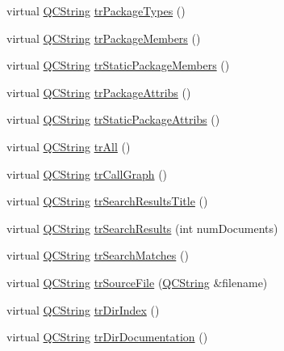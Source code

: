 \begin{DoxyCompactItemize}
\item 
virtual \hyperlink{class_q_c_string}{Q\+C\+String} \hyperlink{class_translator_czech_aea4c9b20ea5461d0060e8396f9157422}{tr\+Package\+Types} ()
\item 
virtual \hyperlink{class_q_c_string}{Q\+C\+String} \hyperlink{class_translator_czech_a37d1d9bee84d6f8b69b5c08282551039}{tr\+Package\+Members} ()
\item 
virtual \hyperlink{class_q_c_string}{Q\+C\+String} \hyperlink{class_translator_czech_a91fbd284b264185d83624aa3eb48412a}{tr\+Static\+Package\+Members} ()
\item 
virtual \hyperlink{class_q_c_string}{Q\+C\+String} \hyperlink{class_translator_czech_a5cd1b4cfc102e8e0ae7768823aa46b91}{tr\+Package\+Attribs} ()
\item 
virtual \hyperlink{class_q_c_string}{Q\+C\+String} \hyperlink{class_translator_czech_a007495c5ee1b5ec8a7a84c76561a5ff3}{tr\+Static\+Package\+Attribs} ()
\item 
virtual \hyperlink{class_q_c_string}{Q\+C\+String} \hyperlink{class_translator_czech_ac85dbb937992350c03a8e236da3041b1}{tr\+All} ()
\item 
virtual \hyperlink{class_q_c_string}{Q\+C\+String} \hyperlink{class_translator_czech_a655e2f987a1a8e57e46b98025cd0dfb7}{tr\+Call\+Graph} ()
\item 
virtual \hyperlink{class_q_c_string}{Q\+C\+String} \hyperlink{class_translator_czech_a9e8cc117dd63c1cd8563c21e400f6b63}{tr\+Search\+Results\+Title} ()
\item 
virtual \hyperlink{class_q_c_string}{Q\+C\+String} \hyperlink{class_translator_czech_a60aa91665044c59bb7124454ebc03af3}{tr\+Search\+Results} (int num\+Documents)
\item 
virtual \hyperlink{class_q_c_string}{Q\+C\+String} \hyperlink{class_translator_czech_ae7016606545b5c6ca5437aa4fd1c87f5}{tr\+Search\+Matches} ()
\item 
virtual \hyperlink{class_q_c_string}{Q\+C\+String} \hyperlink{class_translator_czech_a06a0c380cbb43d799fa553f4838b45ee}{tr\+Source\+File} (\hyperlink{class_q_c_string}{Q\+C\+String} \&filename)
\item 
virtual \hyperlink{class_q_c_string}{Q\+C\+String} \hyperlink{class_translator_czech_ab1ba980534dfebb0e523a7a36f0a5489}{tr\+Dir\+Index} ()
\item 
virtual \hyperlink{class_q_c_string}{Q\+C\+String} \hyperlink{class_translator_czech_a4469309f5c391636ecfe608d1680774d}{tr\+Dir\+Documentation} ()
\item 

\end{DoxyCompactItemize}
